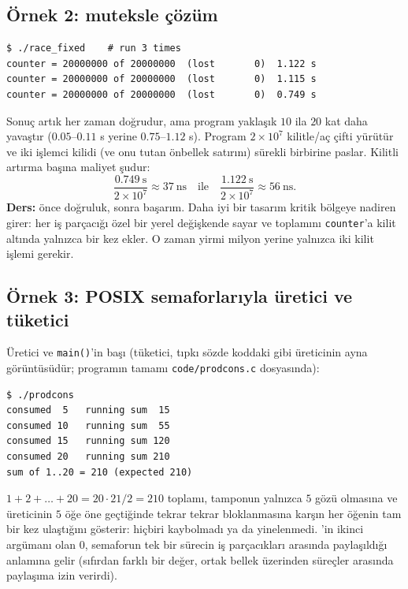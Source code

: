 \subsection{Örnek 2: muteksle çözüm}



\begin{lstlisting}[style=term]
$ ./race_fixed    # run 3 times
counter = 20000000 of 20000000  (lost       0)  1.122 s
counter = 20000000 of 20000000  (lost       0)  1.115 s
counter = 20000000 of 20000000  (lost       0)  0.749 s
\end{lstlisting}

Sonuç artık her zaman doğrudur, ama program yaklaşık $10$ ila $20$ kat daha yavaştır ($0.05$--$0.11$ s yerine $0.75$--$1.12$ s). Program $2\times10^{7}$ kilitle/aç çifti yürütür ve iki işlemci kilidi (ve onu tutan önbellek satırını) sürekli birbirine paslar. Kilitli artırma başına maliyet şudur:
\[
\frac{0.749\ \text{s}}{2\times10^{7}} \approx 37\ \text{ns} \quad\text{ile}\quad \frac{1.122\ \text{s}}{2\times10^{7}} \approx 56\ \text{ns}.
\]
\textbf{Ders:} önce doğruluk, sonra başarım. Daha iyi bir tasarım kritik bölgeye nadiren girer: her iş parçacığı özel bir yerel değişkende sayar ve toplamını \texttt{counter}'a kilit altında yalnızca bir kez ekler. O zaman yirmi milyon yerine yalnızca iki kilit işlemi gerekir.

\subsection{Örnek 3: POSIX semaforlarıyla üretici ve tüketici}
\label{sec:prodcons}

Üretici ve \texttt{main()}'in başı (tüketici, tıpkı sözde koddaki gibi üreticinin ayna görüntüsüdür; programın tamamı \texttt{code/prodcons.c} dosyasında):


\begin{lstlisting}[style=term]
$ ./prodcons
consumed  5   running sum  15
consumed 10   running sum  55
consumed 15   running sum 120
consumed 20   running sum 210
sum of 1..20 = 210 (expected 210)
\end{lstlisting}

$1+2+\dots+20 = 20\cdot21/2 = 210$ toplamı, tamponun yalnızca $5$ gözü olmasına ve üreticinin $5$ öğe öne geçtiğinde tekrar tekrar bloklanmasına karşın her öğenin tam bir kez ulaştığını gösterir: hiçbiri kaybolmadı ya da yinelenmedi. 'in ikinci argümanı olan $0$, semaforun tek bir sürecin iş parçacıkları arasında paylaşıldığı anlamına gelir (sıfırdan farklı bir değer, ortak bellek üzerinden süreçler arasında paylaşıma izin verirdi).

